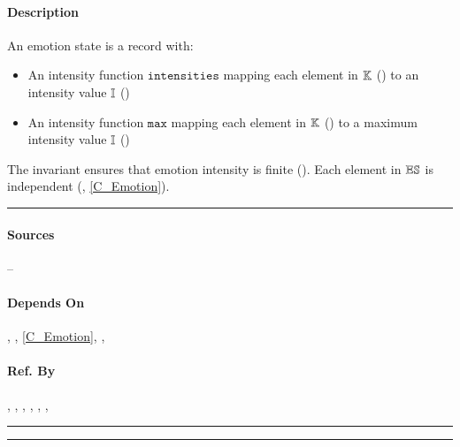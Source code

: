 \paragraph{Description} An emotion state is a record with:
\begin{itemize}

    \item An intensity function $\mathtt{intensities}$ mapping each element in
    $\mathbb{K}$ () to an intensity value
    $\mathbb{I}$ ()

    \item An intensity function $\mathtt{max}$ mapping each element in
    $\mathbb{K}$ () to a maximum intensity value
    $\mathbb{I}$ ()

\end{itemize}

The invariant ensures that emotion intensity is finite
(). Each element in $\mathbb{ES}$ is independent
(, \cref{C_Emotion}).\\\hrule

\paragraph{Sources} --

\paragraph{Depends On} , ,
\cref{C_Emotion}, , 

\paragraph{Ref. By} , ,
, , ,
, 
\\\hrule\vspace{0.5mm}\hrule

~\newline


